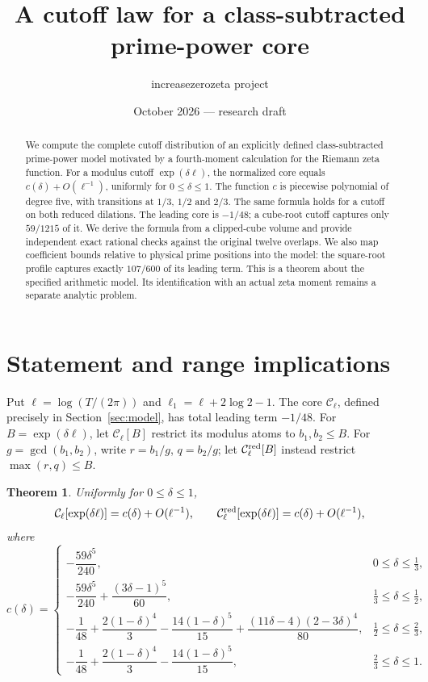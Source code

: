\documentclass[11pt]{article}
\title{A cutoff law for a class-subtracted prime-power core}
\author{increasezerozeta project}
\date{October 2026 --- research draft}
\newtheorem{theorem}{Theorem}
\newcommand{\Core}{\mathcal C}
\begin{document}
\maketitle
\begin{abstract}
We compute the complete cutoff distribution of an explicitly defined
class-subtracted prime-power model motivated by a fourth-moment
calculation for the Riemann zeta function. For a modulus cutoff
$\exp(\delta\ell)$, the normalized core equals $c(\delta)+O(\ell^{-1})$,
uniformly for $0\leq\delta\leq1$. The function $c$ is piecewise polynomial
of degree five, with transitions at $1/3$, $1/2$ and $2/3$.
The same formula holds for a cutoff on both reduced dilations.
The leading core is $-1/48$; a cube-root cutoff captures only $59/1215$
of it. We derive the formula from a clipped-cube volume and provide
independent exact rational checks against the original twelve overlaps.
We also map coefficient bounds relative to physical prime positions
into the model: the square-root profile captures exactly $107/600$
of its leading term.
This is a theorem about the specified arithmetic model. Its identification
with an actual zeta moment remains a separate analytic problem.
\end{abstract}

\section{Statement and range implications}
Put $\ell=\log(T/(2\pi))$ and $\ell_1=\ell+2\log2-1$.
The core $\Core_\ell$, defined precisely in Section~\ref{sec:model},
has total leading term $-1/48$. For $B=\exp(\delta\ell)$, let
$\Core_\ell[B]$ restrict its modulus atoms to $b_1,b_2\leq B$.
For $g=\gcd(b_1,b_2)$, write $r=b_1/g$, $q=b_2/g$; let
$\Core_\ell^{\rm red}[B]$ instead restrict $\max(r,q)\leq B$.

\begin{theorem}\label{thm:main}
Uniformly for $0\leq\delta\leq1$,
\[
 \Core_\ell[\exp(\delta\ell)]
 =c(\delta)+O(\ell^{-1}),\qquad
 \Core_\ell^{\rm red}[\exp(\delta\ell)]
 =c(\delta)+O(\ell^{-1}),
\]
where
\[
c(\delta)=
\begin{cases}
-\dfrac{59\delta^5}{240},&0\leq\delta\leq\frac13,\\[4pt]
-\dfrac{59\delta^5}{240}+\dfrac{(3\delta-1)^5}{60},
 &\frac13\leq\delta\leq\frac12,\\[4pt]
-\dfrac1{48}+\dfrac{2(1-\delta)^4}{3}
 -\dfrac{14(1-\delta)^5}{15}
 +\dfrac{(11\delta-4)(2-3\delta)^4}{80},
 &\frac12\leq\delta\leq\frac23,\\[4pt]
-\dfrac1{48}+\dfrac{2(1-\delta)^4}{3}
 -\dfrac{14(1-\delta)^5}{15},
 &\frac23\leq\delta\leq1.
\end{cases}
\]
\end{theorem}
\end{document}
